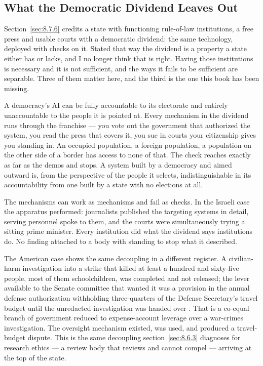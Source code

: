 \subsection{What the Democratic Dividend Leaves Out}
\label{sec:8.7.10}
Section~\ref{sec:8.7.6} credits a state with functioning rule-of-law institutions, a free press and usable courts with a democratic dividend: the same technology, deployed with checks on it. Stated that way the dividend is a property a state either has or lacks, and I no longer think that is right. Having those institutions is necessary and it is not sufficient, and the ways it fails to be sufficient are separable. Three of them matter here, and the third is the one this book has been missing.

A democracy's AI can be fully accountable to its electorate and entirely unaccountable to the people it is pointed at. Every mechanism in the dividend runs through the franchise — you vote out the government that authorized the system, you read the press that covers it, you sue in courts your citizenship gives you standing in. An occupied population, a foreign population, a population on the other side of a border has access to none of that. The check reaches exactly as far as the demos and stops. A system built by a democracy and aimed outward is, from the perspective of the people it selects, indistinguishable in its accountability from one built by a state with no elections at all.

The mechanisms can work as mechanisms and fail as checks. In the Israeli case the apparatus performed: journalists published the targeting systems in detail, serving personnel spoke to them, and the courts were simultaneously trying a sitting prime minister. Every institution did what the dividend says institutions do. No finding attached to a body with standing to stop what it described.

The American case shows the same decoupling in a different register. A civilian-harm investigation into a strike that killed at least a hundred and sixty-five people, most of them schoolchildren, was completed and not released; the lever available to the Senate committee that wanted it was a provision in the annual defense authorization withholding three-quarters of the Defense Secretary's travel budget until the unredacted investigation was handed over \autocite{stassis2026senate}. That is a co-equal branch of government reduced to expense-account leverage over a war-crimes investigation. The oversight mechanism existed, was used, and produced a travel-budget dispute. This is the same decoupling section~\ref{sec:8.6.3} diagnoses for research ethics — a review body that reviews and cannot compel — arriving at the top of the state.

